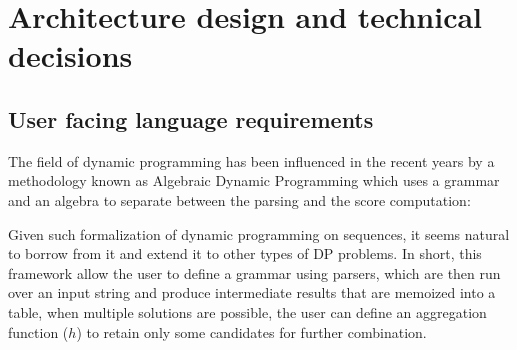 \newpage
\section{Architecture design and technical decisions} \label{architecture}
\subsection{User facing language requirements} \label{user_lang}
The field of dynamic programming has been influenced in the recent years by a methodology known as Algebraic Dynamic Programming which uses a grammar and an algebra to separate between the parsing and the score computation:

Given such formalization \cite{adp} of dynamic programming on sequences, it seems natural to borrow from it and extend it to other types of DP problems. In short, this framework allow the user to define a grammar using parsers, which are then run over an input string and produce intermediate results that are memoized into a table, when multiple solutions are possible, the user can define an aggregation function ($h$) to retain only some candidates for further combination.

